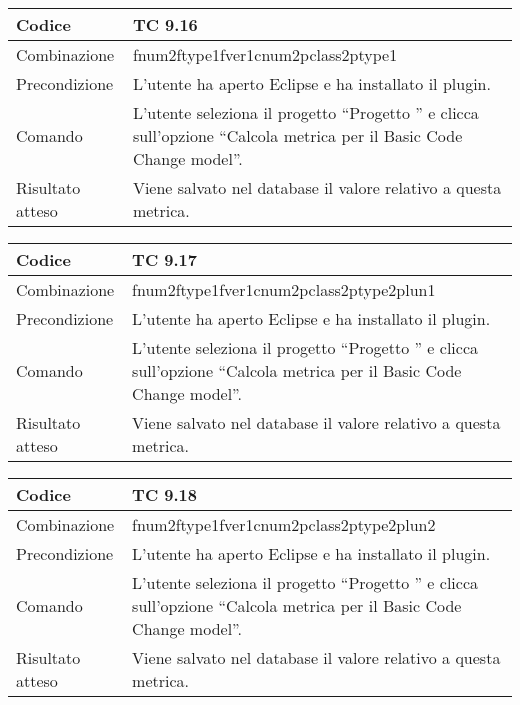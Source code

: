 \begin{table}[ht]
\begin{tabular}{|p{3cm}|p{9cm}|}
\hline
\cellcolor{lightgray}Codice				& TC 9.16								\\
\hline
\cellcolor{lightgray}Combinazione		& fnum2ftype1fver1cnum2pclass2ptype1									\\
\hline
\cellcolor{lightgray}Precondizione		& L'utente ha aperto Eclipse e ha installato il plugin.		\\
\hline
\cellcolor{lightgray}Comando			& L'utente seleziona il progetto ``Progetto ''  e clicca sull'opzione ``Calcola metrica per il Basic Code Change model''.	\\
\hline
\cellcolor{lightgray}Risultato atteso	& Viene salvato nel database il valore relativo a questa metrica.\\
\hline
\end{tabular}
\end{table}

\begin{table}[ht]
\begin{tabular}{|p{3cm}|p{9cm}|}
\hline
\cellcolor{lightgray}Codice				& TC 9.17								\\
\hline
\cellcolor{lightgray}Combinazione		& fnum2ftype1fver1cnum2pclass2ptype2plun1									\\
\hline
\cellcolor{lightgray}Precondizione		& L'utente ha aperto Eclipse e ha installato il plugin.		\\
\hline
\cellcolor{lightgray}Comando			& L'utente seleziona il progetto ``Progetto ''  e clicca sull'opzione ``Calcola metrica per il Basic Code Change model''.	\\
\hline
\cellcolor{lightgray}Risultato atteso	& Viene salvato nel database il valore relativo a questa metrica.\\
\hline
\end{tabular}
\end{table}

\begin{table}[ht]
\begin{tabular}{|p{3cm}|p{9cm}|}
\hline
\cellcolor{lightgray}Codice				& TC 9.18								\\
\hline
\cellcolor{lightgray}Combinazione		& fnum2ftype1fver1cnum2pclass2ptype2plun2									\\
\hline
\cellcolor{lightgray}Precondizione		& L'utente ha aperto Eclipse e ha installato il plugin.		\\
\hline
\cellcolor{lightgray}Comando			& L'utente seleziona il progetto ``Progetto ''  e clicca sull'opzione ``Calcola metrica per il Basic Code Change model''.	\\
\hline
\cellcolor{lightgray}Risultato atteso	& Viene salvato nel database il valore relativo a questa metrica.\\
\hline
\end{tabular}
\end{table}


